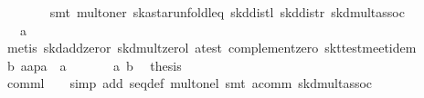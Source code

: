 \begin{isabellebody}
\ \ \ \ \ \ \isamarkupfalse%
\ {}smt\ mult{}oner\ ska{}star{}unfoldl{}eq\ skd{}distl\ skd{}distr\ skd{}mult{}assoc{}\isanewline
\ \ \ \ \isamarkupfalse%
\ \isamarkupfalse%
\ {}{}{}{}\ {}\ a{}{}\isanewline
\ \ \ \ \ \ \isamarkupfalse%
\ {}metis\ skd{}add{}zeror\ skd{}mult{}zerol\ a{}test\ complement{}zero\ skt{}test{}meet{}idem{}\isanewline
\ \ \ \ \isamarkupfalse%
\ \isamarkupfalse%
\ b{}\ {}a{}{}{}{}a{}{}p{}{}{}a{}\ {}\ a{}{}\ \isamarkupfalse%
\isanewline
\isanewline
\ \ \ \ \isamarkupfalse%
\ a\ b\ \isamarkupfalse%
\ {}thesis\isanewline
\ \ \ \ \ \ \isamarkupfalse%
\ {}comml{}\ {}\ {}\ {}{}\ simp\ add{}\ seq{}def\ mult{}onel{}\ smt\ a{}comm\ skd{}mult{}assoc{}\isanewline

\end{isabellebody}
